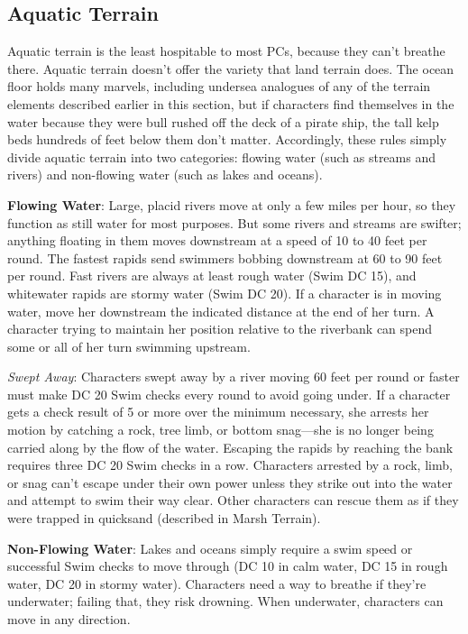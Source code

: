 \subsection{Aquatic Terrain}

				
Aquatic terrain is the least hospitable to most PCs, because they can't breathe there. Aquatic terrain doesn't offer the variety that land terrain does. The ocean floor holds many marvels, including undersea analogues of any of the terrain elements described earlier in this section, but if characters find themselves in the water because they were bull rushed off the deck of a pirate ship, the tall kelp beds hundreds of feet below them don't matter. Accordingly, these rules simply divide aquatic terrain into two categories: flowing water (such as streams and rivers) and non-flowing water (such as lakes and oceans).
				
\textbf{Flowing Water}: Large, placid rivers move at only a few miles per hour, so they function as still water for most purposes. But some rivers and streams are swifter; anything floating in them moves downstream at a speed of 10 to 40 feet per round. The fastest rapids send swimmers bobbing downstream at 60 to 90 feet per round. Fast rivers are always at least rough water (Swim DC 15), and whitewater rapids are stormy water (Swim DC 20). If a character is in moving water, move her downstream the indicated distance at the end of her turn. A character trying to maintain her position relative to the riverbank can spend some or all of her turn swimming upstream.
				
\textit{Swept Away}: Characters swept away by a river moving 60 feet per round or faster must make DC 20 Swim checks every round to avoid going under. If a character gets a check result of 5 or more over the minimum necessary, she arrests her motion by catching a rock, tree limb, or bottom snag---she is no longer being carried along by the flow of the water. Escaping the rapids by reaching the bank requires three DC 20 Swim checks in a row. Characters arrested by a rock, limb, or snag can't escape under their own power unless they strike out into the water and attempt to swim their way clear. Other characters can rescue them as if they were trapped in quicksand (described in Marsh Terrain). 
				
\textbf{Non-Flowing Water}: Lakes and oceans simply require a swim speed or successful Swim checks to move through (DC 10 in calm water, DC 15 in rough water, DC 20 in stormy water). Characters need a way to breathe if they're underwater; failing that, they risk drowning. When underwater, characters can move in any direction.
				
